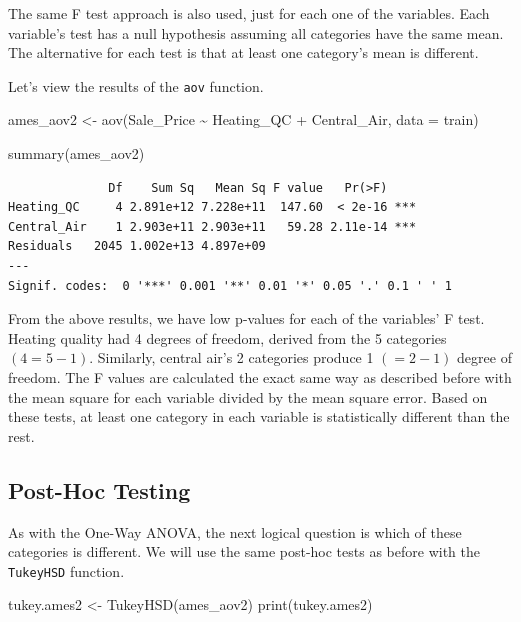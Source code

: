 \documentclass[
  letterpaper,
  DIV=11,
  numbers=noendperiod]{scrreprt}
\newenvironment{Shaded}{\begin{snugshade}}{\end{snugshade}}
\newcommand{\AttributeTok}[1]{\textcolor[rgb]{0.40,0.45,0.13}{#1}}
\newcommand{\FunctionTok}[1]{\textcolor[rgb]{0.28,0.35,0.67}{#1}}
\newcommand{\NormalTok}[1]{\textcolor[rgb]{0.00,0.23,0.31}{#1}}
\newcommand{\OtherTok}[1]{\textcolor[rgb]{0.00,0.23,0.31}{#1}}
\newcommand{\SpecialCharTok}[1]{\textcolor[rgb]{0.37,0.37,0.37}{#1}}
\begin{document}
The same F test approach is also used, just for each one of the
variables. Each variable's test has a null hypothesis assuming all
categories have the same mean. The alternative for each test is that at
least one category's mean is different.

Let's view the results of the \texttt{aov} function.

\begin{Shaded}
\begin{Highlighting}[]
\NormalTok{ames\_aov2 }\OtherTok{\textless{}{-}} \FunctionTok{aov}\NormalTok{(Sale\_Price }\SpecialCharTok{\textasciitilde{}}\NormalTok{ Heating\_QC }\SpecialCharTok{+}\NormalTok{ Central\_Air, }\AttributeTok{data =}\NormalTok{ train)}

\FunctionTok{summary}\NormalTok{(ames\_aov2)}
\end{Highlighting}
\end{Shaded}

\begin{verbatim}
              Df    Sum Sq   Mean Sq F value   Pr(>F)    
Heating_QC     4 2.891e+12 7.228e+11  147.60  < 2e-16 ***
Central_Air    1 2.903e+11 2.903e+11   59.28 2.11e-14 ***
Residuals   2045 1.002e+13 4.897e+09                     
---
Signif. codes:  0 '***' 0.001 '**' 0.01 '*' 0.05 '.' 0.1 ' ' 1
\end{verbatim}

From the above results, we have low p-values for each of the variables'
F test. Heating quality had 4 degrees of freedom, derived from the 5
categories \((4 = 5-1)\). Similarly, central air's 2 categories produce
1 \((= 2-1)\) degree of freedom. The F values are calculated the exact
same way as described before with the mean square for each variable
divided by the mean square error. Based on these tests, at least one
category in each variable is statistically different than the rest.

\hypertarget{post-hoc-testing}{%
\subsection{Post-Hoc Testing}\label{post-hoc-testing}}

As with the One-Way ANOVA, the next logical question is which of these
categories is different. We will use the same post-hoc tests as before
with the \texttt{TukeyHSD} function.

\begin{Shaded}
\begin{Highlighting}[]
\NormalTok{tukey.ames2 }\OtherTok{\textless{}{-}} \FunctionTok{TukeyHSD}\NormalTok{(ames\_aov2)}
\FunctionTok{print}\NormalTok{(tukey.ames2)}
\end{Highlighting}
\end{Shaded}
\end{document}
